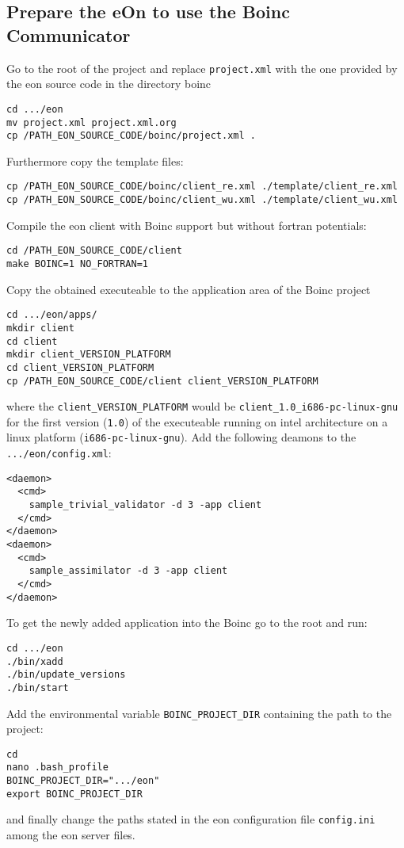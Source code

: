 \documentclass{article}
\begin{document}
\subsection{Prepare the eOn to use the Boinc Communicator}
Go to the root of the project and replace \texttt{project.xml} with the one provided by the eon source code in the directory boinc
\begin{verbatim}
cd .../eon
mv project.xml project.xml.org
cp /PATH_EON_SOURCE_CODE/boinc/project.xml .
\end{verbatim}
%
Furthermore copy the template files:
\begin{verbatim}
cp /PATH_EON_SOURCE_CODE/boinc/client_re.xml ./template/client_re.xml
cp /PATH_EON_SOURCE_CODE/boinc/client_wu.xml ./template/client_wu.xml
\end{verbatim}
%
Compile the eon client with Boinc support but without fortran potentials:
\begin{verbatim}
cd /PATH_EON_SOURCE_CODE/client
make BOINC=1 NO_FORTRAN=1
\end{verbatim}
%
Copy the obtained executeable to the application area of the Boinc project
\begin{verbatim}
cd .../eon/apps/
mkdir client
cd client
mkdir client_VERSION_PLATFORM
cd client_VERSION_PLATFORM
cp /PATH_EON_SOURCE_CODE/client client_VERSION_PLATFORM
\end{verbatim}
where the \texttt{client\_VERSION\_PLATFORM} would be \texttt{client\_1.0\_i686-pc-linux-gnu} for the first version (\texttt{1.0}) of the executeable running on intel architecture on a linux platform (\texttt{i686-pc-linux-gnu}).
Add the following deamons to the \texttt{.../eon/config.xml}:
\begin{verbatim}
<daemon>
  <cmd>
    sample_trivial_validator -d 3 -app client
  </cmd>
</daemon>
<daemon>
  <cmd>
    sample_assimilator -d 3 -app client
  </cmd>
</daemon>
\end{verbatim}
%
To get the newly added application into the Boinc go to the root and run:
\begin{verbatim}
cd .../eon
./bin/xadd
./bin/update_versions
./bin/start
\end{verbatim}
%
Add the environmental variable \texttt{BOINC\_PROJECT\_DIR} containing the path to the project:
\begin{verbatim}
cd
nano .bash_profile
BOINC_PROJECT_DIR=".../eon"
export BOINC_PROJECT_DIR
\end{verbatim}
and finally change the paths stated in the eon configuration file \texttt{config.ini} among the eon server files.
\end{document}
